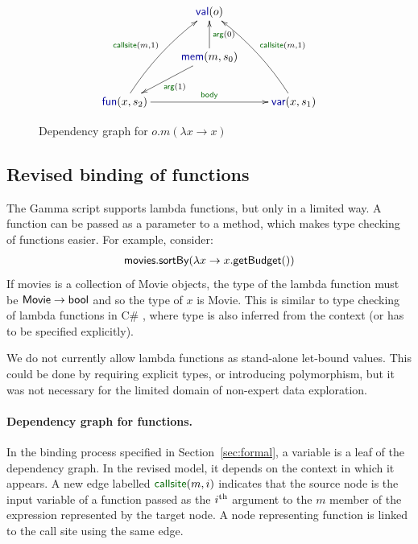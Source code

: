 \documentclass[sigplan,10pt,review,anonymous]{acmart}\settopmatter{printfolios=true,printccs=false,printacmref=false}
\theoremstyle{plain}
\theoremstyle{definition}
\newcommand{\ident}[1]{\textnormal{\sffamily #1}}
\newcommand{\bnd}[1]{\textnormal{\textcolor{kvdclr}{\sffamily #1}}}
\newcommand{\blbl}[1]{\textnormal{\textcolor{numclr}{\sffamily #1}}}
\begin{document}
\begin{figure}[!b]
\vspace{-0.5em}
\begin{equation*}
\xymatrix{
&\bnd{val}(o)\\
&\bnd{mem}(m, s_0) \ar[u]_{\blbl{arg}(0)} \ar[dl]^{\blbl{arg}(1)} \\
\bnd{fun}(x, s_2) \ar@/^/[uur]^{\blbl{callsite}(m, 1)} \ar[rr]^{\blbl{body}} && \bnd{var}(x, s_1) \ar@/_/[uul]_{\blbl{callsite}(m, 1)}
}  
\end{equation*}
\caption{Dependency graph for $o.m(\lambda x\rightarrow x)$}
\label{fig:graph-func}
\end{figure}


\subsection{Revised binding of functions}
\label{sec:types-funs}

The Gamma script supports lambda functions, but only in a limited way. A function can be passed
as a parameter to a method, which makes type checking of functions easier. For example, consider:
%
\begin{equation*}
\begin{array}{l}  
\ident{movies}.\ident{sortBy}(\lambda x \rightarrow x.\ident{getBudget}())
\end{array}
\end{equation*}
%
If \ident{movies} is a collection of \ident{Movie} objects, the type of the lambda function must be
$\ident{Movie}\rightarrow\ident{bool}$ and so the type of $x$ is \ident{Movie}. This is similar to
type checking of lambda functions in C\# \cite{csharp}, where type is also inferred from the context (or has
to be specified explicitly). 

We do not currently allow lambda functions as stand-alone let-bound 
values. This could be done by requiring explicit types, or introducing polymorphism, but it was not
necessary for the limited domain of non-expert data exploration.

\paragraph{Dependency graph for functions.}
In the binding process specified in Section~\ref{sec:formal}, a variable is a leaf of the dependency
graph. In the revised model, it depends on the context in which it appears. A new edge labelled
$\blbl{callsite}(m, i)$ indicates that the source node is the input variable of a function 
passed as the $i^\textnormal{th}$ argument to the $m$ member of the expression represented by the
target node. A node representing function is linked to the call site using the same edge.
\end{document}
